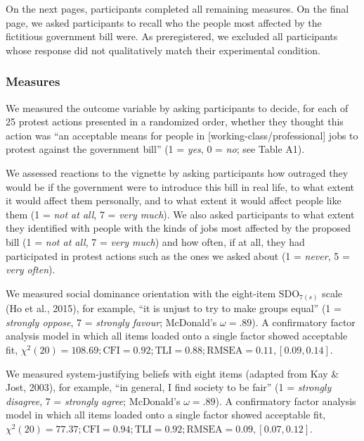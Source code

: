\documentclass[twocolumn, 11pt, letterpaper]{article}
\begin{document}
On the next pages, participants completed all remaining measures. On the
final page, we asked participants to recall who the people most affected
by the fictitious government bill were. As preregistered, we excluded
all participants whose response did not qualitatively match their
experimental condition.

\hypertarget{measures}{%
\subsubsection{Measures}\label{measures}}

We measured the outcome variable by asking participants to decide, for
each of 25 protest actions presented in a randomized order, whether they
thought this action was ``an acceptable means for people in
{[}working-class/professional{]} jobs to protest against the government
bill'' (1 = \emph{yes}, 0 = \emph{no}; see Table A1).

We assessed reactions to the vignette by asking participants how
outraged they would be if the government were to introduce this bill in
real life, to what extent it would affect them personally, and to what
extent it would affect people like them (1 = \emph{not at all}, 7 =
\emph{very much}). We also asked participants to what extent they
identified with people with the kinds of jobs most affected by the
proposed bill (1 = \emph{not at all}, 7 = \emph{very much}) and how
often, if at all, they had participated in protest actions such as the
ones we asked about (1 = \emph{never}, 5 = \emph{very often}).

We measured social dominance orientation with the eight-item
\(\text{SDO}_{7(s)}\) scale (Ho et al., 2015), for example, ``it is
unjust to try to make groups equal'' (1 = \emph{strongly oppose}, 7 =
\emph{strongly favour}; McDonald's \(\omega = .89\)). A confirmatory
factor analysis model in which all items loaded onto a single factor
showed acceptable fit,
\(\chi^2 (20) = 108.69; \text{CFI} = 0.92; \text{TLI} = 0.88; \text{RMSEA} = 0.11, [0.09, 0.14]\).

We measured system-justifying beliefs with eight items (adapted from Kay
\& Jost, 2003), for example, ``in general, I find society to be fair''
(1 = \emph{strongly disagree}, 7 = \emph{strongly agree}; McDonald's
\(\omega = .89\)). A confirmatory factor analysis model in which all
items loaded onto a single factor showed acceptable fit,
\(\chi^2 (20) = 77.37; \text{CFI} = 0.94; \text{TLI} = 0.92; \text{RMSEA} = 0.09, [0.07, 0.12]\).
\end{document}
